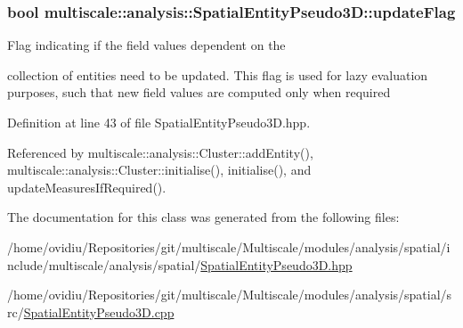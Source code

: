 \hypertarget{classmultiscale_1_1analysis_1_1SpatialEntityPseudo3D_a2fc7e2c00fcd725cb247b27c69726c8b}{
\subsubsection[{update\-Flag}]{\setlength{\rightskip}{0pt plus 5cm}bool multiscale\-::analysis\-::\-Spatial\-Entity\-Pseudo3\-D\-::update\-Flag\hspace{0.3cm}{\ttfamily [protected]}}}\label{classmultiscale_1_1analysis_1_1SpatialEntityPseudo3D_a2fc7e2c00fcd725cb247b27c69726c8b}
\begin{DoxyVerb}                Flag indicating if the field values dependent on the
\end{DoxyVerb}
 collection of entities need to be updated. This flag is used for lazy evaluation purposes, such that new field values are computed only when required 

Definition at line 43 of file Spatial\-Entity\-Pseudo3\-D.\-hpp.



Referenced by multiscale\-::analysis\-::\-Cluster\-::add\-Entity(), multiscale\-::analysis\-::\-Cluster\-::initialise(), initialise(), and update\-Measures\-If\-Required().



The documentation for this class was generated from the following files\-:\begin{DoxyCompactItemize}
\item 
/home/ovidiu/\-Repositories/git/multiscale/\-Multiscale/modules/analysis/spatial/include/multiscale/analysis/spatial/\hyperlink{SpatialEntityPseudo3D_8hpp}{Spatial\-Entity\-Pseudo3\-D.\-hpp}\item 
/home/ovidiu/\-Repositories/git/multiscale/\-Multiscale/modules/analysis/spatial/src/\hyperlink{SpatialEntityPseudo3D_8cpp}{Spatial\-Entity\-Pseudo3\-D.\-cpp}\end{DoxyCompactItemize}
